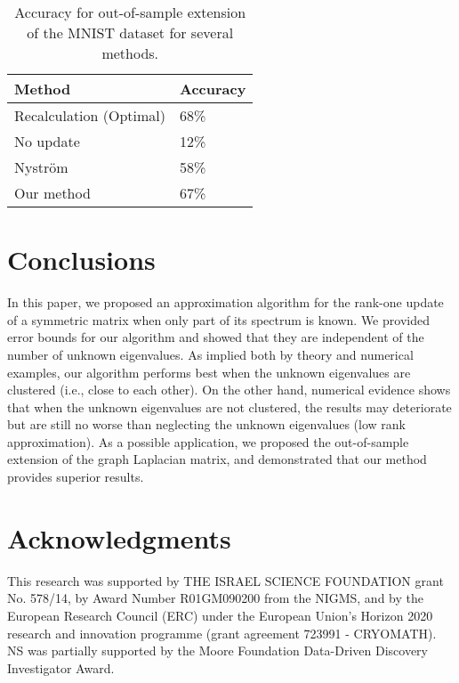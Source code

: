 \documentclass[11pt]{article}
\begin{document}
\begin{table}
\centering
\begin{tabular}{|l|l|}
\hline
Method                       & Accuracy \\ \hline
Recalculation (Optimal)                &68\%     \\ \hline
No update                    & 12\%     \\ \hline
Nystr{\"o}m & 58\%     \\ \hline
Our method                   & 67\%     \\ \hline
\end{tabular}
\caption{Accuracy for out-of-sample extension of the MNIST dataset for several methods.}
\label{tbl:ml_comparison}
\end{table}

\section{Conclusions} \label{sec:conclusions}

In this paper, we proposed an approximation algorithm for the rank-one update of a symmetric matrix when only part of its spectrum is known.  We provided error bounds for our algorithm and showed that they are independent of the number of unknown eigenvalues. As implied both by theory and numerical examples, our algorithm performs best when the unknown eigenvalues are clustered (i.e., close to each other). On the other hand, numerical evidence shows that when the unknown eigenvalues are not clustered, the results may deteriorate but are still no worse than neglecting the unknown eigenvalues (low rank approximation). As a possible application, we proposed the out-of-sample extension of the graph Laplacian matrix, and demonstrated that our method provides superior results. 


%
\section*{Acknowledgments}
This research was supported by THE ISRAEL SCIENCE FOUNDATION grant No. 578/14, by Award Number R01GM090200 from the NIGMS, and by the European Research Council (ERC) under the European Union’s Horizon 2020 research and innovation programme (grant agreement 723991 - CRYOMATH). NS was partially supported by the Moore Foundation Data-Driven Discovery Investigator Award.
%
\end{document}
